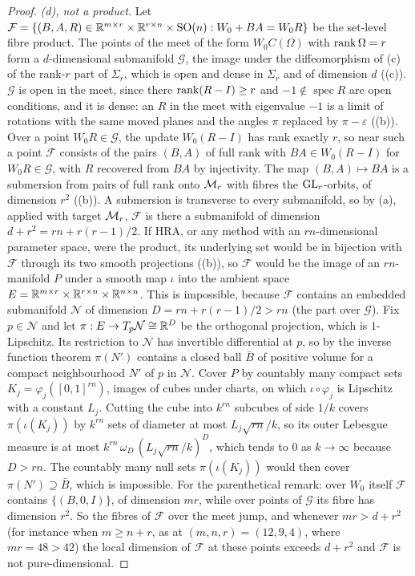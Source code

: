 \begin{proof}
\emph{(d), not a product.} Let $\mathcal F=\{(B,A,R)\in\mathbb{R}^{m\times r}\times\mathbb{R}^{r\times n}\times\mathrm{SO}(n):W_0+BA=W_0R\}$ be the
set-level fibre product. The points of the meet of the form $W_0C(\Omega)$ with $\operatorname{rank}\Omega=r$ form a $d$-dimensional
submanifold $\mathcal G$, the image under the diffeomorphism of (c) of the rank-$r$ part of $\Sigma_r$, which is open and
dense in $\Sigma_r$ and of dimension $d$ ((c)). $\mathcal G$ is open in the meet, since there $\operatorname{rank}(R-I)\ge r$ and
$-1\notin\operatorname{spec}R$ are open conditions, and it is dense: an $R$ in the meet with eigenvalue $-1$ is a limit of
rotations with the same moved planes and the angles $\pi$ replaced by $\pi-\varepsilon$ ((b)). Over a point
$W_0R\in\mathcal G$, the update $W_0(R-I)$ has rank exactly $r$, so near such a point $\mathcal F$ consists of the pairs
$(B,A)$ of full rank with $BA\in W_0(R-I)$ for $W_0R\in\mathcal G$, with $R$ recovered from $BA$ by injectivity. The map
$(B,A)\mapsto BA$ is a submersion from pairs of full rank onto $\mathcal{M}_r$ with fibres the $\mathrm{GL}_r$-orbits, of dimension $r^2$
((b)). A submersion is transverse to every submanifold, so by (a), applied with target $\mathcal{M}_r$,
$\mathcal F$ is there a submanifold of dimension $d+r^2=rn+r(r-1)/2$. If HRA, or any method with an
$rn$-dimensional parameter space, were the product, its underlying set would be in bijection with $\mathcal F$ through its
two smooth projections ((b)), so $\mathcal F$ would be the image of an $rn$-manifold $P$ under
a smooth map $\iota$ into the ambient space $E=\mathbb{R}^{m\times r}\times\mathbb{R}^{r\times n}\times\mathbb{R}^{n\times n}$. This is
impossible, because $\mathcal F$ contains an embedded submanifold $\mathcal N$ of dimension $D=rn+r(r-1)/2>rn$ (the part
over $\mathcal G$). Fix $p\in\mathcal N$ and let $\pi:E\to T_p\mathcal N\cong\mathbb{R}^D$ be the orthogonal projection, which is
$1$-Lipschitz. Its restriction to $\mathcal N$ has invertible differential at $p$, so by the inverse function theorem
$\pi(N')$ contains a closed ball $\bar B$ of positive volume for a compact neighbourhood $N'$ of $p$ in $\mathcal N$. Cover
$P$ by countably many compact sets $K_j=\varphi_j([0,1]^{rn})$, images of cubes under charts, on which $\iota\circ\varphi_j$
is Lipschitz with a constant $L_j$. Cutting the cube into $k^{rn}$ subcubes of side $1/k$ covers $\pi(\iota(K_j))$ by
$k^{rn}$ sets of diameter at most $L_j\sqrt{rn}/k$, so its outer Lebesgue measure is at most
$k^{rn}\,\omega_D\,(L_j\sqrt{rn}/k)^D$, which tends to $0$ as $k\to\infty$ because $D>rn$. The countably many null sets
$\pi(\iota(K_j))$ would then cover $\pi(N')\supseteq\bar B$, which is impossible. For the parenthetical remark: over $W_0$ itself $\mathcal F$ contains $\{(B,0,I)\}$, of dimension $mr$,
while over points of $\mathcal G$ its fibre has dimension $r^2$. So the fibres of $\mathcal F$ over the meet jump, and
whenever $mr>d+r^2$ (for instance when $m\ge n+r$, as at $(m,n,r)=(12,9,4)$, where $mr=48>42$) the local dimension of
$\mathcal F$ at these points exceeds $d+r^2$ and $\mathcal F$ is not pure-dimensional.


\end{proof}
